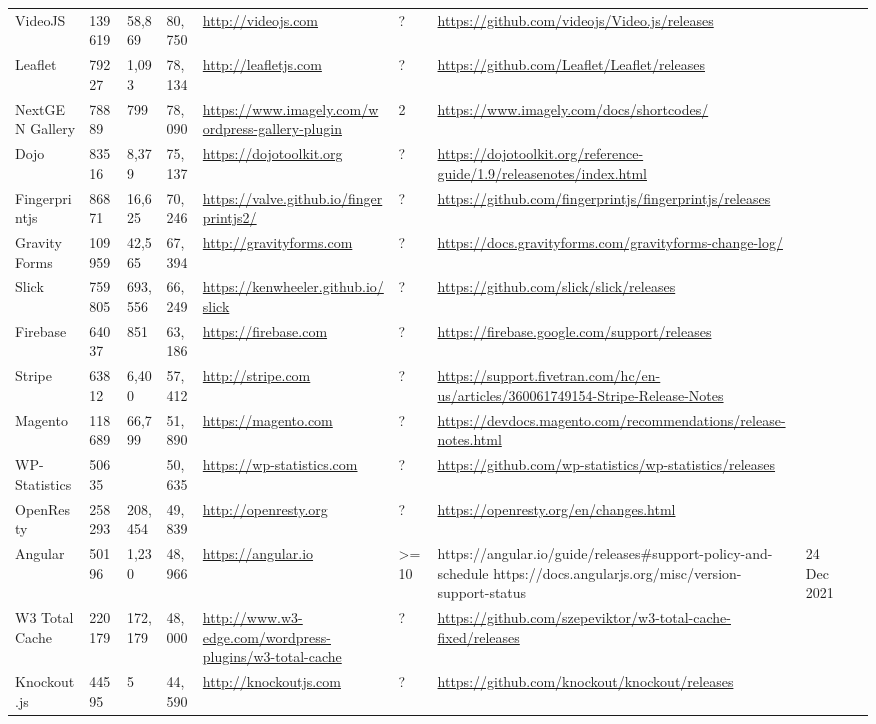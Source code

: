 \begin{table}[!htp]
\begin{tabular}{|l|l|l|l|l|l|l|l|l|}
				VideoJS &139619 &58,869 &80,750 &\ul{http://videojs.com} &? &\ul{https://github.com/videojs/Video.js/releases} & \\
				Leaflet &79227 &1,093 &78,134 &\ul{http://leafletjs.com} &? &\ul{https://github.com/Leaflet/Leaflet/releases} & \\
				NextGEN Gallery &78889 &799 &78,090 &\ul{https://www.imagely.com/wordpress-gallery-plugin} &2 &\ul{https://www.imagely.com/docs/shortcodes/} & \\
				Dojo &83516 &8,379 &75,137 &\ul{https://dojotoolkit.org} &? &\ul{https://dojotoolkit.org/reference-guide/1.9/releasenotes/index.html} & \\
				Fingerprintjs &86871 &16,625 &70,246 &\ul{https://valve.github.io/fingerprintjs2/} &? &\ul{https://github.com/fingerprintjs/fingerprintjs/releases} & \\
				Gravity Forms &109959 &42,565 &67,394 &\ul{http://gravityforms.com} &? &\ul{https://docs.gravityforms.com/gravityforms-change-log/} & \\
				Slick &759805 &693,556 &66,249 &\ul{https://kenwheeler.github.io/slick} &? &\ul{https://github.com/slick/slick/releases} & \\
				Firebase &64037 &851 &63,186 &\ul{https://firebase.com} &? &\ul{https://firebase.google.com/support/releases} & \\
				Stripe &63812 &6,400 &57,412 &\ul{http://stripe.com} &? &\ul{https://support.fivetran.com/hc/en-us/articles/360061749154-Stripe-Release-Notes} & \\
				Magento &118689 &66,799 &51,890 &\ul{https://magento.com} &? &\ul{https://devdocs.magento.com/recommendations/release-notes.html} & \\
				WP-Statistics &50635 & &50,635 &\ul{https://wp-statistics.com} &? &\ul{https://github.com/wp-statistics/wp-statistics/releases} & \\
				OpenResty &258293 &208,454 &49,839 &\ul{http://openresty.org} &? &\ul{https://openresty.org/en/changes.html} & \\
				Angular &50196 &1,230 &48,966 &\ul{https://angular.io} &>= 10 &https://angular.io/guide/releases\#support-policy-and-schedule https://docs.angularjs.org/misc/version-support-status &24 Dec 2021 \\
				W3 Total Cache &220179 &172,179 &48,000 &\ul{http://www.w3-edge.com/wordpress-plugins/w3-total-cache} &? &\ul{https://github.com/szepeviktor/w3-total-cache-fixed/releases} & \\
				Knockout.js &44595 &5 &44,590 &\ul{http://knockoutjs.com} &? &\ul{https://github.com/knockout/knockout/releases} & \\

\end{tabular}
\end{table}
